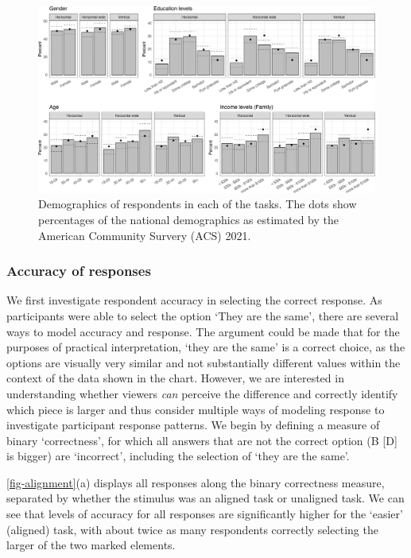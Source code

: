 \documentclass[
]{jds}
\begin{document}
\begin{figure}[hbt]

{\centering \includegraphics{./figures/fig-rounds-demographics-1.png}

}

\caption{\label{fig-rounds-demographics}Demographics of respondents in
each of the tasks. The dots show percentages of the national
demographics as estimated by the American Community Survery (ACS) 2021.}

\end{figure}

\hypertarget{accuracy-of-responses}{%
\subsubsection{Accuracy of responses}\label{accuracy-of-responses}}

We first investigate respondent accuracy in selecting the correct
response. As participants were able to select the option `They are the
same', there are several ways to model accuracy and response. The
argument could be made that for the purposes of practical
interpretation, `they are the same' is a correct choice, as the options
are visually very similar and not substantially different values within
the context of the data shown in the chart. However, we are interested
in understanding whether viewers \emph{can} perceive the difference and
correctly identify which piece is larger and thus consider multiple ways
of modeling response to investigate participant response patterns. We
begin by defining a measure of binary `correctness', for which all
answers that are not the correct option (B {[}D{]} is bigger) are
`incorrect', including the selection of `they are the same'.

\autoref{fig-alignment}(a) displays all responses along the binary
correctness measure, separated by whether the stimulus was an aligned
task or unaligned task. We can see that levels of accuracy for all
responses are significantly higher for the `easier' (aligned) task, with
about twice as many respondents correctly selecting the larger of the
two marked elements.
\end{document}
